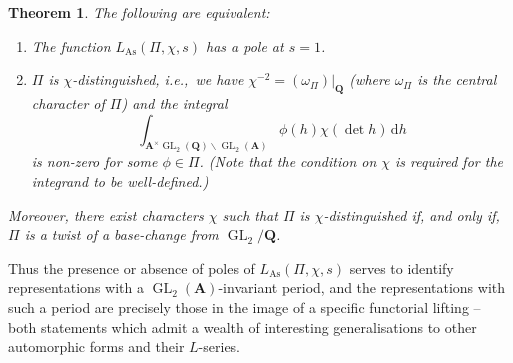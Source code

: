 \documentclass[a4paper,10pt]{amsart}
\theoremstyle{plain}
\newtheorem{theorem}{Theorem}[section]
\theoremstyle{remark}
\DeclareMathOperator{\GL}{GL}
\DeclareMathOperator{\Sym}{Sym}
\DeclareMathOperator{\BC}{BC}
\DeclareMathOperator{\As}{As}
\renewcommand{\AA}{\mathbf{A}}
\newcommand{\QQ}{\mathbf{Q}}
\numberwithin{equation}{section}
\begin{document}
  \begin{theorem}\label{thm:whenpoles}
   The following are equivalent:
   \begin{enumerate}
    \item The function $L_{\As}(\Pi, \chi, s)$ has a pole at $s = 1$.
    \item $\Pi$ is \emph{$\chi$-distinguished}, i.e.,~we have $\chi^{-2} = (\omega_{\Pi})|_{\QQ}$ (where $\omega_{\Pi}$ is the central character of $\Pi$) and the integral
    \[ \int_{\AA^\times \GL_2(\QQ) \backslash \GL_2(\AA)} \phi(h) \chi(\det h) \, \mathrm{d}h \]
    is non-zero for some $\phi \in \Pi$. (Note that the condition on $\chi$ is required for the integrand to be well-defined.)
   \end{enumerate}
   Moreover, there exist characters $\chi$ such that $\Pi$ is $\chi$-distinguished if, and only if, $\Pi$ is a twist of a base-change from $\GL_2 / \QQ$.
  \end{theorem}


  Thus the presence or absence of poles of $L_{\As}(\Pi, \chi, s)$ serves to identify representations with a $\GL_2(\AA)$-invariant period, and the representations with such a period are precisely those in the image of a specific functorial lifting -- both statements which admit a wealth of interesting generalisations to other automorphic forms and their $L$-series.
\end{document}
